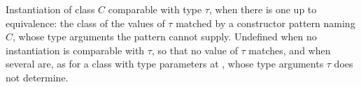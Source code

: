 Instantiation of class $C$ comparable with type $\tau$, when there is one up to equivalence: the class of the
values of $\tau$ matched by a constructor pattern naming $C$, whose type arguments the pattern cannot
supply. Undefined when no instantiation is comparable with $\tau$, so that no value of $\tau$ matches, and
when several are, as for a class with type parameters at \tyObject, whose type arguments $\tau$ does not
determine.
